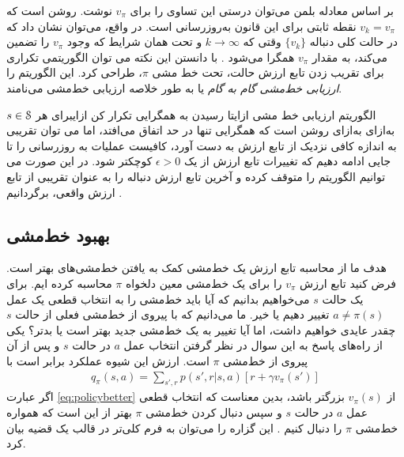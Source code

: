 بر اساس معادله بلمن می‌توان درستی این تساوی را برای 
$v_{\pi}$
نوشت. روشن است که 
 $v_k = v_{\pi}$
 نقطه ثابتی برای این قانون به‌روز‌رسانی است.
 در واقع، می‌توان نشان داد که در حالت کلی دنباله 
 $\{ v_k \}$
وقتی که 
$ k \rightarrow \infty $
و تحت همان شرایط که وجود 
$v_{\pi}$
را تضمین می‌کند، به مقدار 
$v_{\pi}$
همگرا می‌شود \cite{suttonbook}. با دانستن این نکته می توان الگوریتمی تکراری برای  تقریب زدن تابع ارزش حالت، تحت خط مشی $\pi$، طراحی کرد. این الگوریتم را 
\textit{ارزیابی خط‌مشی گام به گام}
 یا به طور خلاصه 
ارزیابی خط‌مشی
 می‌نامند.


{الگوریتم ارزیابی خط مشی}
‌ازای{تا رسیدن به همگرایی تکرار کن}
‌ازای{برای هر $s \in \EuScript{S}$}
‌به‌ازای
‌به‌ازای
روشن است که همگرایی تنها در حد اتفاق می‌افتد، اما می توان تقریبی به اندازه کافی نزدیک از تابع ارزش به دست آورد، کافیست عملیات به روزرسانی را تا جایی ادامه دهیم که تغییرات تابع ارزش از یک
$\epsilon > 0$
کوچکتر شود. در این صورت می توانیم الگوریتم را متوقف کرده و آخرین تابع ارزش دنباله را به عنوان تقریبی از تابع ارزش واقعی، برگردانیم \cite{suttonbook}.

% 
%

\subsection{بهبود خط‌مشی}

هدف ما از محاسبه تابع ارزش یک خط‌مشی کمک به یافتن خط‌مشی‌های بهتر است.
فرض کنید تابع ارزش 
$v_{\pi}$
 را برای یک خط‌مشی معین  دلخواه 
 $\pi$
  محاسبه کرده ایم. برای یک حالت 
  $s$
 می‌خواهیم بدانیم که آیا باید خط‌مشی را به انتخاب قطعی یک عمل 
 $a \neq \pi(s)$
  تغییر دهیم یا خیر.
ما می‌دانیم که با پیروی از خط‌مشی فعلی از حالت
 $s$
  چقدر عایدی خواهیم داشت، اما آیا تغییر به یک خط‌مشی جدید بهتر است یا بدتر؟
  یکی از راه‌های پاسخ به این سوال در نظر گرفتن انتخاب عمل  
  $a$
در حالت 
$s$
و پس از آن پیروی از خط‌مشی
$\pi$
 است. 
 ارزش این شیوه عملکرد برابر است با
 \begin{align}
q_\pi(s,a) = \sum_{s',r} p(s',r|s,a)\left[r + \gamma v_\pi(s')\right]	
 	\label{eq:policybetter}
 \end{align}
 اگر عبارت 
 \ref{eq:policybetter}
 از $v_\pi(s)$ بزرگتر باشد، بدین معناست که انتخاب قطعی عمل $a$ در حالت $s$ و سپس دنبال کردن خط‌مشی $\pi$ بهتر از این است که همواره خط‌مشی $\pi$ را دنبال کنیم \cite{suttonbook}. این گزاره را می‌توان به فرم کلی‌تر در قالب یک قضیه بیان کرد.

